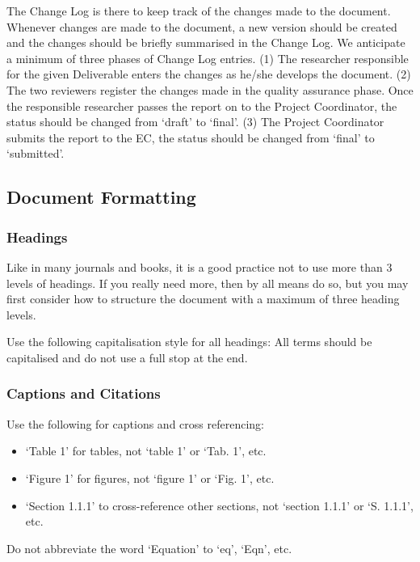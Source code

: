 The Change Log is there to keep track of the changes made to the document. Whenever changes are made to the document, a new version should be created and the changes should be briefly summarised in the Change Log. We anticipate a minimum of three phases of Change Log entries. (1) The researcher responsible for the given Deliverable enters the changes as he/she develops the document. (2) The two reviewers register the changes made in the quality assurance phase. Once the responsible researcher passes the report on to the Project Coordinator, the status should be changed from ‘draft’ to ‘final’. (3) The Project Coordinator submits the report to the EC, the status should be changed from ‘final’ to ‘submitted’.

\subsection{Document Formatting}
\label{sec:document-formatting}

\subsubsection{Headings}
\label{sec:headings}

Like in many journals and books, it is a good practice not to use more than 3 levels of headings. If you really need more, then by all means do so, but you may first consider how to structure the document with a maximum of three heading levels. 

Use the following capitalisation style for all headings: All terms should be capitalised and do not use a full stop at the end.

\subsubsection{Captions and Citations}
\label{sec:captions-and-citations}

Use the following for captions and cross referencing:

\begin{itemize}
	\item ‘Table 1’ for tables, not ‘table 1’ or ‘Tab. 1’, etc.
	\item ‘Figure 1’ for figures, not ‘figure 1’ or ‘Fig. 1’, etc.
	\item ‘Section 1.1.1’ to cross-reference other sections, not ‘section 1.1.1’ or ‘S. 1.1.1’, etc.
\end{itemize}

Do not abbreviate the word ‘Equation’ to ‘eq’, ‘Eqn’, etc.

